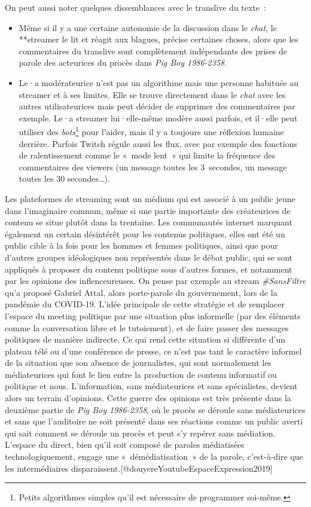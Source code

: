 \documentclass[
]{article}
\providecommand{\tightlist}{%
  \setlength{\itemsep}{0pt}\setlength{\parskip}{0pt}}
\begin{document}
On peut aussi noter quelques dissemblances avec le translive du texte~:

\begin{itemize}
\tightlist
\item
  Même si il y a une certaine autonomie de la discussion dans le \emph{chat}, le **streamer le lit et réagit aux blagues, précise certaines choses, alors que les commentaires du translive sont complètement indépendants des prises de parole des acteurices du procès dans \emph{Pig Boy 1986-2358}.
\item
  Le·a modérateurice n'est pas un algorithme mais une personne habituée au streamer et à ses limites. Elle se trouve directement dans le \emph{chat }avec les autres utilisateurices mais peut décider de supprimer des commentaires par exemple. Le·a streamer lui·elle-même modère aussi parfois, et il·elle peut utiliser des \emph{bots}\footnote{Petits algorithmes simples qu'il est nécessaire de programmer soi-même.} pour l'aider, mais il y a toujours une réflexion humaine derrière. Parfois Twitch régule aussi les flux, avec par exemple des fonctions de ralentissement comme le «~mode lent~» qui limite la fréquence des commentaires des viewers (un message toutes les 3~secondes, un message toutes les 30 secondes\ldots).
\end{itemize}

Les plateformes de streaming sont un médium qui est associé à un public jeune dans l'imaginaire commun, même si une partie importante des créateurices de contenu se situe plutôt dans la trentaine. Les communautés internet marquant également un certain désintérêt pour les contenus politiques, elles ont été un public cible à la fois pour les hommes et femmes politiques, ainsi que pour d'autres groupes idéologiques non représentés dans le débat public, qui se sont appliqués à proposer du contenu politique sous d'autres formes, et notamment par les opinions des inflenceureuses. On pense par exemple au stream \emph{\#SansFiltre} qu'a proposé Gabriel Attal, alors porte-parole du gouvernement, lors de la pandémie du COVID-19. L'idée principale de cette stratégie et de remplacer l'espace du meeting politique par une situation plus informelle (par des éléments comme la conversation libre et le tutoiement), et de faire passer des messages politiques de manière indirecte. Ce qui rend cette situation si différente d'un plateau télé ou d'une conférence de presse, ce n'est pas tant le caractère informel de la situation que son absence de journalistes, qui sont normalement les médiateurices qui font le lien entre la production de contenu informatif ou politique et nous. L'information, sans médiateurices et sans spécialistes, devient alors un terrain d'opinions. Cette guerre des opinions est très présente dans la deuxième partie de \emph{Pig Boy 1986-2358}, où le procès se déroule sans médiateurices et sans que l'auditoire ne soit présenté dans ses réactions comme un public averti qui sait comment se déroule un procès et peut s'y repérer sans médiation. L'espace du direct, bien qu'il soit composé de paroles médiatisées technologiquement, engage une «~démédiatisation~» de la parole, c'est-à-dire que les intermédiaires disparaissent.{[}@douyereYoutubeEspaceExpression2019{]}
\end{document}
